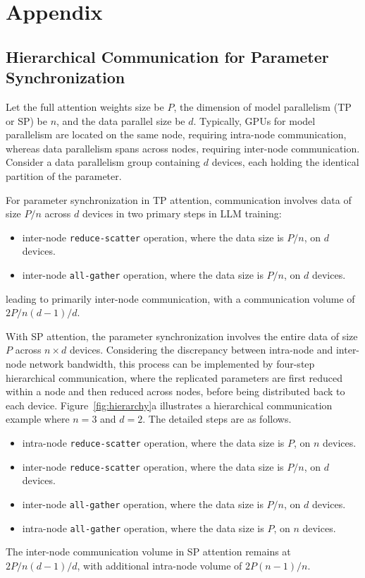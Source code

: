\appendix


\section{Appendix}
\label{apdx}

\subsection{Hierarchical Communication for Parameter Synchronization}
\label{apdx:hierarchical}

Let the full attention weights size be $P$, the dimension of model parallelism (TP or SP) be $n$, and the data parallel size be $d$. Typically, GPUs for model parallelism are located on the same node, requiring intra-node communication, whereas data parallelism spans across nodes, requiring inter-node communication. Consider a data parallelism group containing $d$ devices, each holding the identical partition of the parameter.

For parameter synchronization in TP attention, communication involves data of size $P/n$ across $d$ devices in two primary steps in LLM training:
\begin{itemize}[leftmargin=*]
    \item inter-node \texttt{reduce-scatter} operation, where the data size is $P/n$, on $d$ devices.
    \item inter-node \texttt{all-gather} operation, where the data size is $P/n$, on $d$ devices.
\end{itemize}
leading to primarily inter-node communication, with a communication volume of $2P/n(d-1)/d$.

With SP attention, the parameter synchronization involves the entire data of size $P$ across $n \times d$ devices. Considering the discrepancy between intra-node and inter-node network bandwidth, this process can be implemented by four-step hierarchical communication, where the replicated parameters are first reduced within a node and then reduced across nodes, before being distributed back to each device. Figure~\ref{fig:hierarchy}a illustrates a hierarchical communication example where $n=3$ and $d=2$. The detailed steps are as follows.
\begin{itemize}[leftmargin=*]
    \item intra-node \texttt{reduce-scatter} operation, where the data size is $P$, on $n$ devices.
    \item inter-node \texttt{reduce-scatter} operation, where the data size is $P/n$, on $d$ devices.
    \item inter-node \texttt{all-gather} operation, where the data size is $P/n$, on $d$ devices.
    \item intra-node \texttt{all-gather} operation, where the data size is $P$, on $n$ devices.
\end{itemize}
The inter-node communication volume in SP attention remains at $2P/n(d-1)/d$, with additional intra-node volume of $2P(n-1)/n$.  

